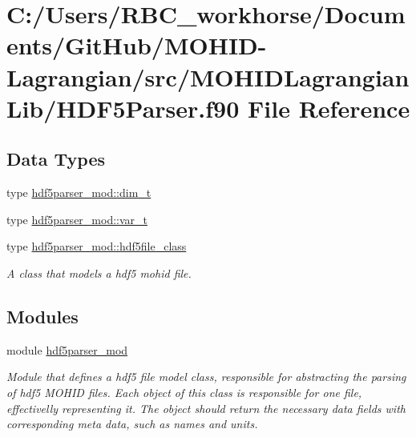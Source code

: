 \hypertarget{_h_d_f5_parser_8f90}{}\section{C\+:/\+Users/\+R\+B\+C\+\_\+workhorse/\+Documents/\+Git\+Hub/\+M\+O\+H\+I\+D-\/\+Lagrangian/src/\+M\+O\+H\+I\+D\+Lagrangian\+Lib/\+H\+D\+F5\+Parser.f90 File Reference}
\label{_h_d_f5_parser_8f90}
\subsection*{Data Types}
\begin{DoxyCompactItemize}
\item 
type \mbox{\hyperlink{structhdf5parser__mod_1_1dim__t}{hdf5parser\+\_\+mod\+::dim\+\_\+t}}
\item 
type \mbox{\hyperlink{structhdf5parser__mod_1_1var__t}{hdf5parser\+\_\+mod\+::var\+\_\+t}}
\item 
type \mbox{\hyperlink{structhdf5parser__mod_1_1hdf5file__class}{hdf5parser\+\_\+mod\+::hdf5file\+\_\+class}}
\begin{DoxyCompactList}\small\item\em A class that models a hdf5 mohid file. \end{DoxyCompactList}\end{DoxyCompactItemize}
\subsection*{Modules}
\begin{DoxyCompactItemize}
\item 
module \mbox{\hyperlink{namespacehdf5parser__mod}{hdf5parser\+\_\+mod}}
\begin{DoxyCompactList}\small\item\em Module that defines a hdf5 file model class, responsible for abstracting the parsing of hdf5 M\+O\+H\+ID files. Each object of this class is responsible for one file, effectivelly representing it. The object should return the necessary data fields with corresponding meta data, such as names and units. \end{DoxyCompactList}\end{DoxyCompactItemize}
